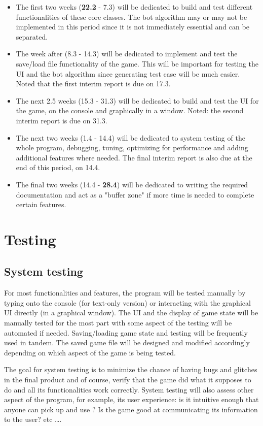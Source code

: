 \documentclass[12pt]{article}
\begin{document}
\begin{itemize}
  \item  The first two weeks (\textbf{22.2} - 7.3) will be dedicated to build
    and test different functionalities of these core classes. The bot algorithm
    may or may not be implemented in this period since it is not immediately
    essential and can be separated.
  \item The week after (8.3 - 14.3) will be dedicated to implement and test the
    save/load file functionality of the game. This will be important for testing
    the UI and the bot algorithm since generating test case will be much easier.
    Noted that the first interim report is due on 17.3.
  \item  The next 2.5 weeks (15.3 - 31.3) will be dedicated to build and test
    the UI for the game, on the console and graphically in a window. Noted: the
    second interim report is due on 31.3.
  \item  The next two weeks (1.4 -  14.4) will be dedicated to system testing of
    the whole program, debugging, tuning, optimizing for performance and adding
    additional features where needed. The final interim report is also due at
    the end of this period, on 14.4.
  \item  The final two weeks (14.4 - \textbf{28.4}) will be dedicated to writing
    the required documentation and act as a "buffer zone" if more time is needed
    to complete certain features.
\end{itemize}
\section{Testing}
\subsection{System testing}

For most functionalities and features, the program will be tested manually by
typing onto the console (for text-only version) or interacting with the
graphical UI directly (in a graphical window). The UI and the display of game
state will be manually tested for the most part with some aspect of the testing
will be automated if needed. Saving/loading game state and testing will be
frequently used in tandem.  The saved game file will be designed and modified
accordingly depending on which aspect of the game is being tested.

The goal for system testing is to minimize the chance of having bugs and
glitches in the final product and of course, verify that the game did what it
supposes to do and all its functionalities work correctly. System testing will
also assess other aspect of the program, for example, its user experience: is it
intuitive enough that anyone can pick up and use ?  Is the game good at
communicating its information to the user? etc \dots.
\end{document}
